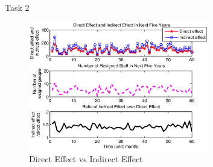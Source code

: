 \documentclass{beamer}
\begin{document}
\begin{frame}{Task 2}
\begin{figure}
\centering
\includegraphics[width=0.70\textwidth]{fig/task-2.eps}
\caption{Direct Effect vs Indirect Effect}
\end{figure}
\end{frame}
\end{document}

